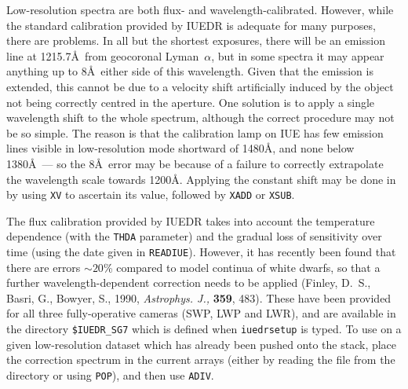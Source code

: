 Low-resolution spectra are both flux- and wavelength-calibrated.  However, while
the standard calibration provided by IUEDR is adequate for many purposes, there
are problems.  In all but the shortest exposures, there will be an emission
line at 1215.7\AA\ from geocoronal Lyman~$\alpha$, but in some spectra it may
appear anything up to 8\AA\ either side of this wavelength. Given that the
emission is extended, this cannot be due to a velocity shift artificially
induced by the object not being correctly centred in the aperture.  One
solution is to apply a single wavelength shift to the whole spectrum, although
the correct procedure may not be so simple.  The reason is that the calibration
lamp on IUE has few emission lines visible in low-resolution mode shortward of
1480\AA , and none below 1380\AA\ --- so the 8\AA\ error may be because of a
failure to correctly extrapolate the wavelength scale towards 1200\AA\@.
Applying the constant shift may be done in 
 by using \verb+XV+ to
ascertain its value, followed by \verb+XADD+ or \verb+XSUB+\@.

\begin{latexonly}
The flux calibration provided by IUEDR takes into account the temperature
dependence (with the \verb+THDA+ parameter) and the gradual loss of sensitivity
over time (using the date given in \verb+READIUE+)\@.  However, it has recently
been found that there are errors $\sim 20$\% compared to model continua of
white dwarfs, so that a further wavelength-dependent correction needs to be
applied (Finley, D.~S., Basri, G., Bowyer, S., 1990, {\it Astrophys. J.,} {\bf
359}, 483). These have been provided for all three fully-operative cameras
(SWP, LWP and LWR), and are available in the directory
\verb+$IUEDR_SG7+ which is defined when \verb+iuedrsetup+ is typed.
To use on a given low-resolution dataset which has already been pushed onto the
stack, place the correction spectrum in the current arrays (either by reading
the file from the directory or using \verb+POP+), and then use
\verb+ADIV+\@.
\end{latexonly}


